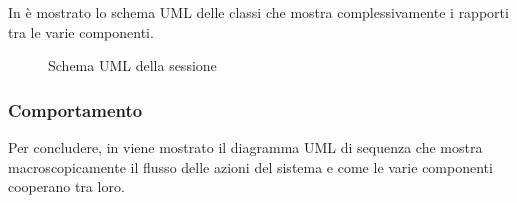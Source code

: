 In  è mostrato lo schema UML delle classi che mostra complessivamente i rapporti tra le varie componenti.

\begin{figure}
    \caption{Schema UML della sessione}
    \label{img:02-session}
\end{figure}

\subsubsection*{Comportamento}
Per concludere, in  viene mostrato il diagramma UML di sequenza che mostra macroscopicamente il flusso delle azioni del sistema e come le varie componenti cooperano tra loro.


